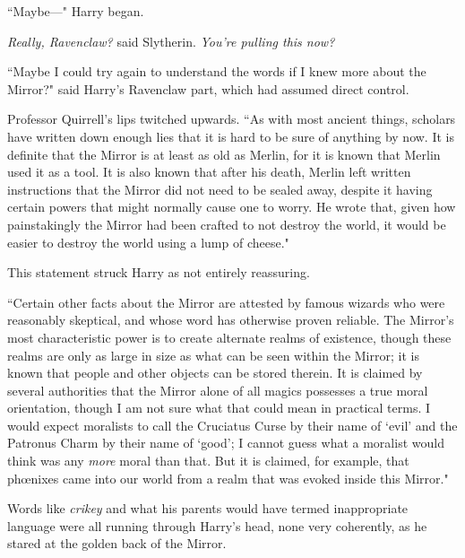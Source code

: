 ``Maybe---" Harry began.

\emph{Really, Ravenclaw?} said Slytherin. \emph{You're pulling this \emph{now}?}

``Maybe I could try again to understand the words if I knew more about the Mirror?" said Harry's Ravenclaw part, which had assumed direct control.

Professor Quirrell's lips twitched upwards. ``As with most ancient things, scholars have written down enough lies that it is hard to be sure of anything by now. It is definite that the Mirror is at least as old as Merlin, for it is known that Merlin used it as a tool. It is also known that after his death, Merlin left written instructions that the Mirror did not need to be sealed away, despite it having certain powers that might normally cause one to worry. He wrote that, given how painstakingly the Mirror had been crafted to not destroy the world, it would be easier to destroy the world using a lump of cheese."

This statement struck Harry as not entirely reassuring.

``Certain other facts about the Mirror are attested by famous wizards who were reasonably skeptical, and whose word has otherwise proven reliable. The Mirror's most characteristic power is to create alternate realms of existence, though these realms are only as large in size as what can be seen within the Mirror; it is known that people and other objects can be stored therein. It is claimed by several authorities that the Mirror alone of all magics possesses a true moral orientation, though I am not sure what that could mean in practical terms. I would expect moralists to call the Cruciatus Curse by their name of `evil' and the Patronus Charm by their name of `good'; I cannot guess what a moralist would think was any \emph{more} moral than that. But it is claimed, for example, that phœnixes came into our world from a realm that was evoked inside this Mirror."

Words like \emph{crikey} and what his parents would have termed inappropriate language were all running through Harry's head, none very coherently, as he stared at the golden back of the Mirror.

